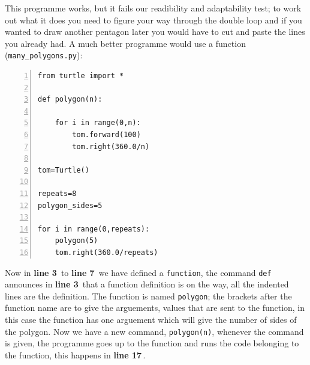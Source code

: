 \documentclass[11pt,a4paper]{scrartcl}
\newcommand{\lnn}[1]{\textbf{line #1}\,}
\begin{document}
This programme works, but it fails our readibility and adaptability
test; to work out what it does you need to figure your way through the
double loop and if you wanted to draw another pentagon later you would
have to cut and paste the lines you already had. A much better
programme would use a function (\texttt{many\_polygons.py}):
\begin{lstlisting}[numbers=left]
from turtle import *

def polygon(n):

    for i in range(0,n):
        tom.forward(100)
        tom.right(360.0/n)

tom=Turtle()

repeats=8
polygon_sides=5

for i in range(0,repeats):
    polygon(5)
    tom.right(360.0/repeats)
\end{lstlisting}
Now in \lnn{3} to \lnn{7} we have defined a \texttt{function}, the
command \texttt{def} announces in \lnn{3} that a function definition
is on the way, all the indented lines are the definition. The function
is named \texttt{polygon}; the brackets after the function name are to
give the arguements, values that are sent to the function, in this
case the function has one arguement which will give the number of
sides of the polygon. Now we have a new command, \texttt{polygon(n)},
whenever the command is given, the programme goes up to the function
and runs the code belonging to the function, this happens in \lnn{17}.
\end{document}
